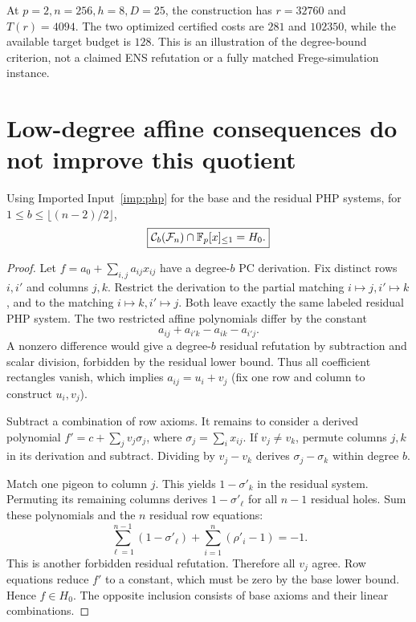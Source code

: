 \begin{example}
At $p=2,n=256,h=8,D=25$, the construction has $r=32760$ and $T(r)=4094$. The two optimized certified costs are $281$ and $102350$, while the available target budget is $128$. This is an illustration of the degree-bound criterion, not a claimed ENS refutation or a fully matched Frege-simulation instance.
\end{example}

\section{Low-degree affine consequences do not improve this quotient}
\begin{theorem}\label{thm:rigidity}
Using Imported Input~\ref{imp:php} for the base and the residual PHP systems, for
$1\le b\le\lfloor(n-2)/2\rfloor$,
\[
 \boxed{\mathcal C_{b}(\mathcal F_n)\cap\mathbb F_p[x]_{\le1}=H_0.}
\]
\end{theorem}
\begin{proof}
Let $f=a_0+\sum_{i,j}a_{ij}x_{ij}$ have a degree-$b$ PC derivation. Fix distinct rows $i,i'$ and columns $j,k$. Restrict the derivation to the partial matching $i\mapsto j,i'\mapsto k$, and to the matching $i\mapsto k,i'\mapsto j$. Both leave exactly the same labeled residual PHP system. The two restricted affine polynomials differ by the constant
\[
 a_{ij}+a_{i'k}-a_{ik}-a_{i'j}.
\]
A nonzero difference would give a degree-$b$ residual refutation by subtraction and scalar division, forbidden by the residual lower bound. Thus all coefficient rectangles vanish, which implies $a_{ij}=u_i+v_j$ (fix one row and column to construct $u_i,v_j$).

Subtract a combination of row axioms. It remains to consider a derived polynomial $f'=c+\sum_jv_j\sigma_j$, where $\sigma_j=\sum_i x_{ij}$. If $v_j\ne v_k$, permute columns $j,k$ in its derivation and subtract. Dividing by $v_j-v_k$ derives $\sigma_j-\sigma_k$ within degree $b$.

Match one pigeon to column $j$. This yields $1-\sigma'_k$ in the residual system. Permuting its remaining columns derives $1-\sigma'_\ell$ for all $n-1$ residual holes. Sum these polynomials and the $n$ residual row equations:
\[
 \sum_{\ell=1}^{n-1}(1-\sigma'_\ell)
 +\sum_{i=1}^{n}(\rho'_i-1)=-1.
\]
This is another forbidden residual refutation. Therefore all $v_j$ agree. Row equations reduce $f'$ to a constant, which must be zero by the base lower bound. Hence $f\in H_0$. The opposite inclusion consists of base axioms and their linear combinations.
\end{proof}

